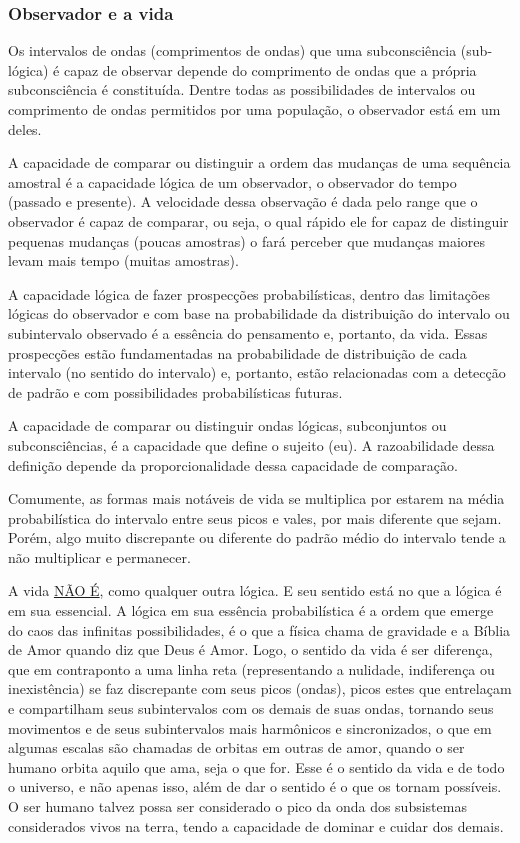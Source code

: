 \subsubsection{Observador e a vida}
Os intervalos de ondas (comprimentos de ondas) que uma subconsciência (sub-lógica) é capaz de observar depende do comprimento de ondas que a própria subconsciência é constituída. Dentre todas as possibilidades de intervalos ou comprimento de ondas permitidos por uma população, o observador está em um deles.

A capacidade de comparar ou distinguir a ordem das mudanças de uma sequência amostral é a capacidade lógica de um observador, o observador do tempo (passado e presente). A velocidade dessa observação é dada pelo range que o observador é capaz de comparar, ou seja, o qual rápido ele for capaz de distinguir pequenas mudanças (poucas amostras) o fará perceber que mudanças maiores levam mais tempo (muitas amostras). 

A capacidade lógica de fazer prospecções probabilísticas, dentro das limitações lógicas do observador e com base na probabilidade da distribuição do intervalo ou subintervalo observado é a essência do pensamento e, portanto, da vida. Essas prospecções estão fundamentadas na probabilidade de distribuição de cada intervalo (no sentido do intervalo) e, portanto, estão relacionadas com a detecção de padrão e com possibilidades probabilísticas futuras.

A capacidade de comparar ou distinguir ondas lógicas, subconjuntos ou subconsciências, é a capacidade que define o sujeito (eu). A razoabilidade dessa definição depende da proporcionalidade dessa capacidade de comparação.

Comumente, as formas mais notáveis de vida se multiplica por estarem na média probabilística do intervalo entre seus picos e vales, por mais diferente que sejam. Porém, algo muito discrepante ou diferente do padrão médio do intervalo tende a não multiplicar e permanecer.

A vida \underline{NÃO É}, como qualquer outra lógica. E seu sentido está no que a lógica é em sua essencial. A lógica em sua essência probabilística é a ordem que emerge do caos das infinitas possibilidades, é o que a física chama de gravidade e a Bíblia de Amor quando diz que Deus é Amor. Logo, o sentido da vida é ser diferença, que em contraponto a uma linha reta (representando a nulidade, indiferença ou inexistência) se faz discrepante com seus picos (ondas), picos estes que entrelaçam e compartilham seus subintervalos com os demais de suas ondas, tornando seus movimentos e de seus subintervalos mais harmônicos e sincronizados, o que em algumas escalas são chamadas de orbitas em outras de amor, quando o ser humano orbita aquilo que ama, seja o que for. Esse é o sentido da vida e de todo o universo, e não apenas isso, além de dar o sentido é o que os tornam possíveis. O ser humano talvez possa ser considerado o pico da onda dos subsistemas considerados vivos na terra, tendo a capacidade de dominar e cuidar dos demais. 

